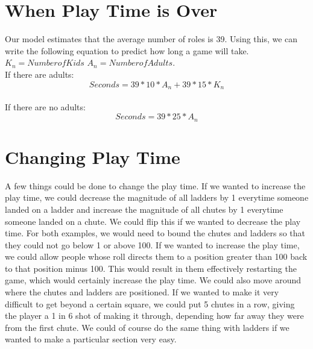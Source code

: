 \documentclass[12pt]{article} %
\begin{document}
\section*{When Play Time is Over}
Our model estimates that the average number of roles is 39. Using this, we can write the following equation to predict how long a game will take. $K_{n}=Number of Kids$ $A_{n}=Number of Adults$.
\\If there are adults:
\[Seconds = 39*10*A_{n} + 39*15*K_{n}\]
\\If there are no adults:
\[Seconds = 39*25*A_{n}\]

\section*{Changing Play Time}
A few things could be done to change the play time. If we wanted to increase the play time, we could decrease the magnitude of all ladders by 1 everytime someone landed on a ladder and increase the magnitude of all chutes by 1 everytime someone landed on a chute. We could flip this if we wanted to decrease the play time. For both examples, we would need to bound the chutes and ladders so that they could not go below 1 or above 100. If we wanted to increase the play time, we could allow people whose roll directs them to a position greater than 100 back to that position minus 100. This would result in them effectively restarting the game, which would certainly increase the play time. We could also move around where the chutes and ladders are positioned. If we wanted to make it very difficult to get beyond a certain square, we could put 5 chutes in a row, giving the player a 1 in 6 shot of making it through, depending how far away they were from the first chute. We could of course do the same thing with ladders if we wanted to make a particular section very easy.
\end{document}
